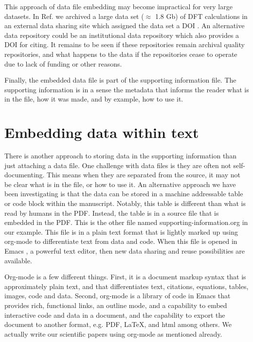 \documentclass[journal=accacs,manuscript=article,email=true]{achemso}
\begin{document}
This approach of data file embedding may become impractical for very large datasets. In Ref.  we archived a large data set ($\approx$ 1.8 Gb) of DFT calculations in an external data sharing site which assigned the data set a DOI \cite{xu-suppor}. An alternative data repository could be an institutional data repository which also provides a DOI for citing. It remains to be seen if these repositories remain archival quality repositories, and what happens to the data if the repositories cease to operate due to lack of funding or other reasons.

Finally, the embedded data file is part of the supporting information file. The supporting information is in a sense the metadata that informs the reader what is in the file, how it was made, and by example, how to use it.

\section{Embedding data within text}
\label{sec-3}

There is another approach to storing data in the supporting information than just attaching a data file. One challenge with data files is they are often not self-documenting. This means when they are separated from the source, it may not be clear what is in the file, or how to use it. An alternative approach we have been investigating is that the data can be stored in a machine addressable table or code block within the manuscript. Notably, this table is different than what is read by humans in the PDF. Instead, the table is in a source file that is embedded in the PDF. This is the other file named supporting-information.org in our example.  This file is in a plain text format that is lightly marked up using org-mode \cite{Dominik201408} to differentiate text from data and code. When this file is opened in Emacs \cite{emacs}, a powerful text editor, then new data sharing and reuse possibilities are available.

Org-mode is a few different things. First, it is a document markup syntax that is approximately plain text, and that differentiates text, citations, equations, tables, images, code and data. Second, org-mode is a library of code in Emacs that provides rich, functional links, an outline mode, and a capability to embed interactive code and data in a document, and the capability to export the document to another format, e.g. PDF, \LaTeX{}, and html among others. We actually write our scientific papers using org-mode as mentioned already.
\end{document}
